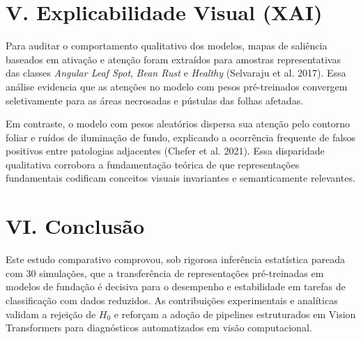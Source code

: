 \documentclass[conference,10pt]{IEEEtran}
\begin{document}
\section{V. Explicabilidade Visual
(XAI)}\label{v.-explicabilidade-visual-xai}

Para auditar o comportamento qualitativo dos modelos, mapas de saliência
baseados em ativação e atenção foram extraídos para amostras
representativas das classes \emph{Angular Leaf Spot}, \emph{Bean Rust} e
\emph{Healthy} (Selvaraju et al. 2017). Essa análise evidencia que as
atenções no modelo com pesos pré-treinados convergem seletivamente para
as áreas necrosadas e pústulas das folhas afetadas.

Em contraste, o modelo com pesos aleatórios dispersa sua atenção pelo
contorno foliar e ruídos de iluminação de fundo, explicando a ocorrência
frequente de falsos positivos entre patologias adjacentes (Chefer et al.
2021). Essa disparidade qualitativa corrobora a fundamentação teórica de
que representações fundamentais codificam conceitos visuais invariantes
e semanticamente relevantes.

\section{VI. Conclusão}\label{vi.-conclusuxe3o}

Este estudo comparativo comprovou, sob rigorosa inferência estatística
pareada com 30 simulações, que a transferência de representações
pré-treinadas em modelos de fundação é decisiva para o desempenho e
estabilidade em tarefas de classificação com dados reduzidos. As
contribuições experimentais e analíticas validam a rejeição de \(H_0\) e
reforçam a adoção de pipelines estruturados em Vision Transformers para
diagnósticos automatizados em visão computacional.
\end{document}
